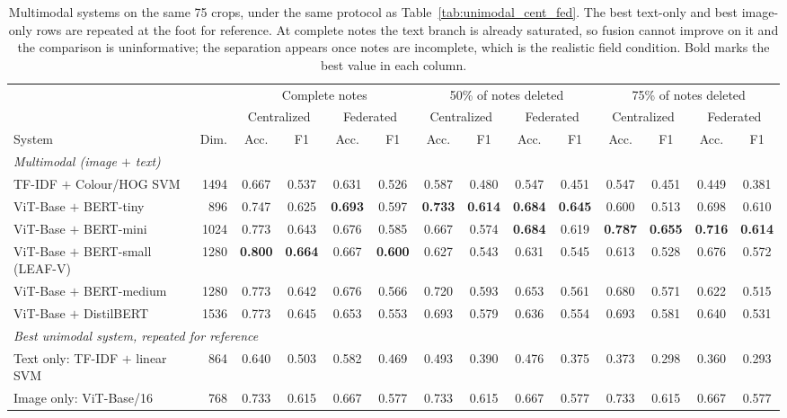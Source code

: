 \begin{table}[t]
\caption{Multimodal systems on the same 75 crops, under the same protocol as Table~\ref{tab:unimodal_cent_fed}. The best text-only and best image-only rows are repeated at the foot for reference. At complete notes the text branch is already saturated, so fusion cannot improve on it and the comparison is uninformative; the separation appears once notes are incomplete, which is the realistic field condition. Bold marks the best value in each column.}
\label{tab:multimodal_cent_fed}
\centering\footnotesize
\setlength\tabcolsep{4pt}
\begin{tabular}{lrcccccccccccc}
\toprule
 &  & \multicolumn{4}{c}{Complete notes} & \multicolumn{4}{c}{50\% of notes deleted} & \multicolumn{4}{c}{75\% of notes deleted}\\
\cmidrule(lr){3-6}\cmidrule(lr){7-10}\cmidrule(lr){11-14}
 &  & \multicolumn{2}{c}{Centralized} & \multicolumn{2}{c}{Federated} & \multicolumn{2}{c}{Centralized} & \multicolumn{2}{c}{Federated} & \multicolumn{2}{c}{Centralized} & \multicolumn{2}{c}{Federated}\\
\cmidrule(lr){3-4}\cmidrule(lr){5-6}\cmidrule(lr){7-8}\cmidrule(lr){9-10}\cmidrule(lr){11-12}\cmidrule(lr){13-14}
System & Dim. & Acc. & F1 & Acc. & F1 & Acc. & F1 & Acc. & F1 & Acc. & F1 & Acc. & F1\\
\midrule
\multicolumn{14}{l}{\emph{Multimodal (image $+$ text)}}\\
TF-IDF $+$ Colour/HOG SVM & 1494 & 0.667 & 0.537 & 0.631 & 0.526 & 0.587 & 0.480 & 0.547 & 0.451 & 0.547 & 0.451 & 0.449 & 0.381\\
ViT-Base $+$ BERT-tiny & 896 & 0.747 & 0.625 & \textbf{0.693} & 0.597 & \textbf{0.733} & \textbf{0.614} & \textbf{0.684} & \textbf{0.645} & 0.600 & 0.513 & 0.698 & 0.610\\
ViT-Base $+$ BERT-mini & 1024 & 0.773 & 0.643 & 0.676 & 0.585 & 0.667 & 0.574 & \textbf{0.684} & 0.619 & \textbf{0.787} & \textbf{0.655} & \textbf{0.716} & \textbf{0.614}\\
ViT-Base $+$ BERT-small (LEAF-V) & 1280 & \textbf{0.800} & \textbf{0.664} & 0.667 & \textbf{0.600} & 0.627 & 0.543 & 0.631 & 0.545 & 0.613 & 0.528 & 0.676 & 0.572\\
ViT-Base $+$ BERT-medium & 1280 & 0.773 & 0.642 & 0.676 & 0.566 & 0.720 & 0.593 & 0.653 & 0.561 & 0.680 & 0.571 & 0.622 & 0.515\\
ViT-Base $+$ DistilBERT & 1536 & 0.773 & 0.645 & 0.653 & 0.553 & 0.693 & 0.579 & 0.636 & 0.554 & 0.693 & 0.581 & 0.640 & 0.531\\
\midrule
\multicolumn{14}{l}{\emph{Best unimodal system, repeated for reference}}\\
Text only: TF-IDF $+$ linear SVM & 864 & 0.640 & 0.503 & 0.582 & 0.469 & 0.493 & 0.390 & 0.476 & 0.375 & 0.373 & 0.298 & 0.360 & 0.293\\
Image only: ViT-Base/16 & 768 & 0.733 & 0.615 & 0.667 & 0.577 & 0.733 & 0.615 & 0.667 & 0.577 & 0.733 & 0.615 & 0.667 & 0.577\\
\bottomrule
\end{tabular}
\end{table}
